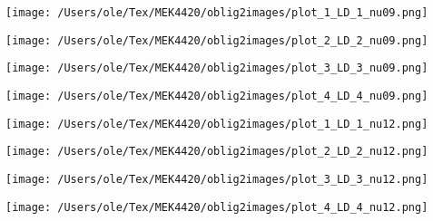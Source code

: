 \documentclass{beamer}
\begin{document}
\begin{frame}
\begin{minipage}[t]{0.45\linewidth}
    \texttt{[image: /Users/ole/Tex/MEK4420/oblig2images/plot\_1\_LD\_1\_nu09.png]}
\end{minipage}
\hspace{0.05\linewidth}
\begin{minipage}[t]{0.45\linewidth}
    \texttt{[image: /Users/ole/Tex/MEK4420/oblig2images/plot\_2\_LD\_2\_nu09.png]}
\end{minipage}
\begin{minipage}[t]{0.45\linewidth}
    \texttt{[image: /Users/ole/Tex/MEK4420/oblig2images/plot\_3\_LD\_3\_nu09.png]}
\end{minipage}
\hspace{0.05\linewidth}
\begin{minipage}[t]{0.45\linewidth}
    \texttt{[image: /Users/ole/Tex/MEK4420/oblig2images/plot\_4\_LD\_4\_nu09.png]}
\end{minipage}
\end{frame}

\begin{frame}
\begin{minipage}[t]{0.45\linewidth}
    \texttt{[image: /Users/ole/Tex/MEK4420/oblig2images/plot\_1\_LD\_1\_nu12.png]}
\end{minipage}
\hspace{0.05\linewidth}
\begin{minipage}[t]{0.45\linewidth}
    \texttt{[image: /Users/ole/Tex/MEK4420/oblig2images/plot\_2\_LD\_2\_nu12.png]}
\end{minipage}
\begin{minipage}[t]{0.45\linewidth}
    \texttt{[image: /Users/ole/Tex/MEK4420/oblig2images/plot\_3\_LD\_3\_nu12.png]}
\end{minipage}
\hspace{0.05\linewidth}
\begin{minipage}[t]{0.45\linewidth}
    \texttt{[image: /Users/ole/Tex/MEK4420/oblig2images/plot\_4\_LD\_4\_nu12.png]}
\end{minipage}
\end{frame}
\end{document}

